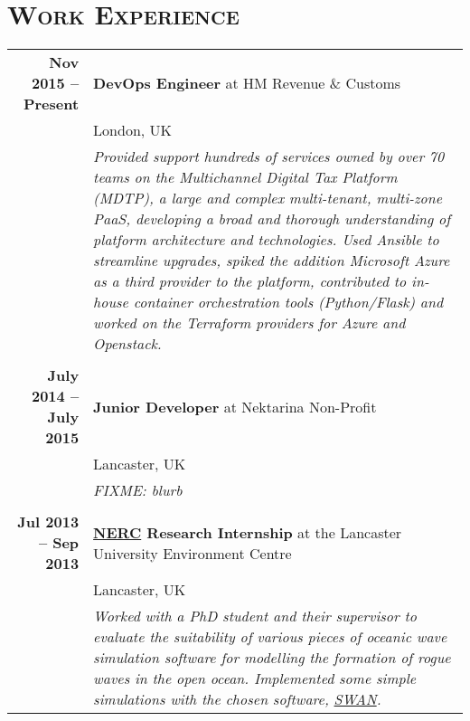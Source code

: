 \documentclass[a4paper,10pt]{article} %
\begin{document}
\section{\textsc{Work Experience}}
\centering
\begin{tabularx}{\textwidth}{r|X}
\textbf{Nov 2015 -- Present}       & \textbf{DevOps Engineer} at HM Revenue \& Customs \\
                                   & London, UK \\
                                   & \footnotesize\emph{Provided support hundreds of services owned by over 70 teams on the Multichannel Digital Tax Platform (MDTP), a large and complex multi-tenant, multi-zone PaaS, developing a broad and thorough understanding of platform architecture and technologies. Used Ansible to streamline upgrades, spiked the addition Microsoft Azure as a third provider to the platform, contributed to in-house container orchestration tools (Python/Flask) and worked on the Terraform providers for Azure and Openstack.} \\
\multicolumn{2}{r}{} \\ %
\textbf{July 2014 -- July 2015}    & \textbf{Junior Developer} at {Nektarina Non-Profit}\\
                                   & Lancaster, UK\\
                                   & \footnotesize\emph{FIXME: blurb}\\
\multicolumn{2}{r}{} \\ %
\textbf{Jul 2013 --  Sep 2013}     & \textbf{\href{http://www.nerc.ac.uk/}{NERC} Research Internship} at the Lancaster University Environment Centre \\
                                   & Lancaster, UK \\
                                   & \footnotesize\emph{Worked with a PhD student and their supervisor to evaluate the suitability of various pieces of oceanic wave simulation software for modelling the formation of rogue waves in the open ocean. Implemented some simple simulations with the chosen software, \href{http://swanmodel.sourceforge.net/}{SWAN}.}                           
\end{tabularx}

\end{document}
